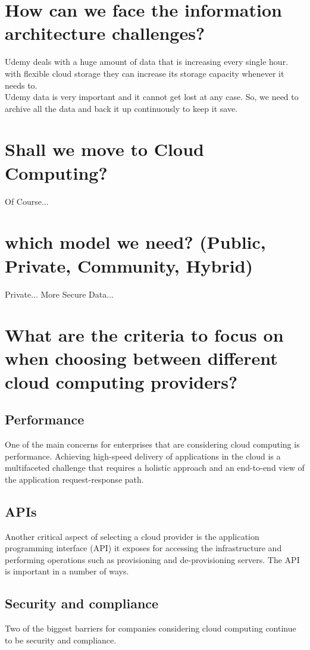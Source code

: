 \documentclass{book}
\begin{document}
\section{How can we face the information architecture challenges?}
Udemy deals with a huge amount of data that is increasing every single hour. with flexible cloud storage they can increase its storage capacity whenever it needs to.
\\
Udemy data is very important and it cannot get lost at any case. So, we need to archive all the data and back it up continuously to keep it save.

\section{Shall we move to Cloud Computing?}
Of Course...

\section{which model we need? (Public, Private, Community, Hybrid)}
Private... More Secure Data...

\section{What are the criteria to focus on when choosing between different cloud computing providers?}
\subsection{Performance}
One of the main concerns for enterprises that are considering cloud computing is performance. Achieving high-speed delivery of applications in the cloud is a multifaceted challenge that requires a holistic approach and an end-to-end view of the application request-response path.
\subsection{APIs}
Another critical aspect of selecting a cloud provider is the application programming interface (API) it exposes for accessing the infrastructure and performing operations such as provisioning and de-provisioning servers. The API is important in a number of ways.
\subsection{Security and compliance}
Two of the biggest barriers for companies considering cloud computing continue to be security and compliance.
\end{document}
